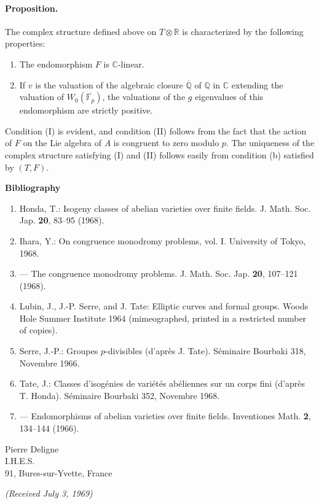 \documentclass[10pt]{article}
\newcommand{\C}{\mathbb C}
\newcommand{\Fp}{\mathbb F_p}
\newcommand{\Q}{\mathbb Q}
\newcommand{\R}{\mathbb R}
\begin{document}
\paragraph{Proposition.} The complex structure defined above on $T\otimes\R$ is characterized by the following properties:
\begin{enumerate}[label=(\Roman*)]
\item The endomorphism $F$ is $\C$-linear.
\item If $v$ is the valuation of the algebraic closure $\overline{\Q}$ of $\Q$ in $\C$ extending the valuation of $W_0(\overline{\Fp})$, the valuations of the $g$ eigenvalues of this endomorphism are strictly positive.
\end{enumerate}
Condition (I) is evident, and condition (II) follows from the fact that the action of $F$ on the Lie algebra of $A$ is congruent to zero modulo $p$. The uniqueness of the complex structure satisfying (I) and (II) follows easily from condition (b) satisfied by $(T,F)$.

\begin{center}
\bfseries Bibliography
\end{center}

\begin{enumerate}[label=\arabic*.,leftmargin=2.4em]
\item Honda, T.: Isogeny classes of abelian varieties over finite fields. J. Math. Soc. Jap. \textbf{20}, 83--95 (1968).
\item Ihara, Y.: On congruence monodromy problems, vol. I. University of Tokyo, 1968.
\item --- The congruence monodromy problems. J. Math. Soc. Jap. \textbf{20}, 107--121 (1968).
\item Lubin, J., J.-P. Serre, and J. Tate: Elliptic curves and formal groups. Woods Hole Summer Institute 1964 (mimeographed, printed in a restricted number of copies).
\item Serre, J.-P.: Groupes $p$-divisibles (d'après J. Tate). Séminaire Bourbaki 318, Novembre 1966.
\item Tate, J.: Classes d'isogénies de variétés abéliennes sur un corps fini (d'après T. Honda). Séminaire Bourbaki 352, Novembre 1968.
\item --- Endomorphisms of abelian varieties over finite fields. Inventiones Math. \textbf{2}, 134--144 (1966).
\end{enumerate}

\begin{flushright}
Pierre Deligne\\
I.H.E.S.\\
91, Bures-sur-Yvette, France
\end{flushright}

\begin{center}
\emph{(Received July 3, 1969)}
\end{center}
\end{document}
